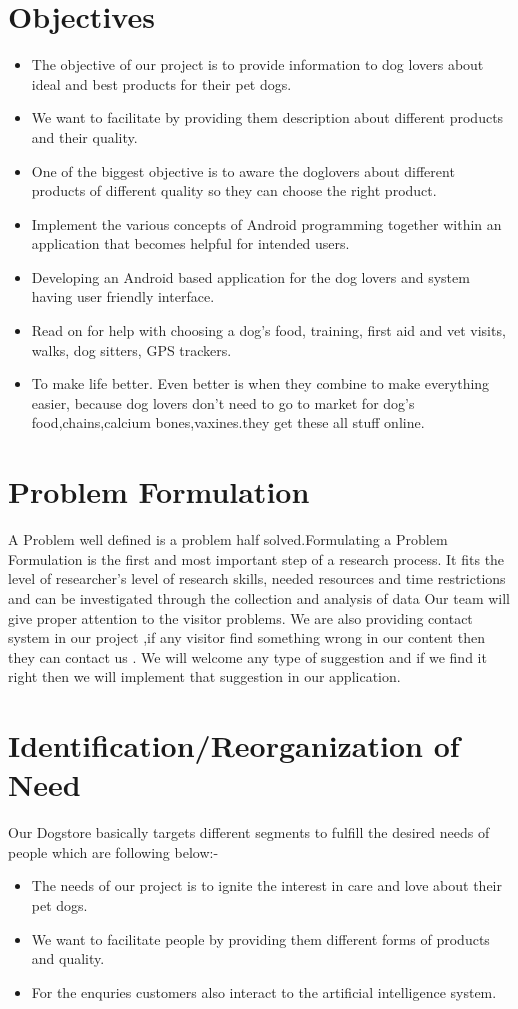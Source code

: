 \section{Objectives}

\begin{itemize}
	\item The objective of our project is to provide information to dog lovers about ideal and best products for their pet dogs.
	\item We want to facilitate by providing them description about different products and their quality. 
	\item One of the biggest objective is to aware the doglovers about different products of different quality so they  can choose the right product.
	\item Implement the various concepts of Android programming together within an application that becomes helpful for intended users.
	\item Developing an Android based application for the dog lovers and system having user friendly interface.
	\item Read on for help with choosing a dog's food, training, first aid and vet visits, walks, dog sitters, GPS trackers.
	\item To make life better. Even better is when they combine to make everything easier, because dog lovers don't need to go to market for dog's food,chains,calcium bones,vaxines.they get these all stuff online.
\end{itemize}
 

\section{Problem Formulation}
A Problem well defined is a problem half solved.Formulating a Problem Formulation is the first and most important step of a research process. It fits the level of researcher’s level of research skills, needed resources and time restrictions and can be investigated through the collection and analysis of data 
Our team will give proper attention to the visitor problems.   
We are also providing contact system in our project  ,if any visitor find something wrong in our content then  they can contact us . 
We will welcome any type of suggestion and if we find it right then we will implement that suggestion in our application.


\section{Identification/Reorganization of Need}
Our Dogstore basically targets different segments to fulfill the desired needs of people which are following below:-
\begin{itemize}
\item The needs of our project is to ignite the interest in care and love about their pet dogs.
\item We want to facilitate people by providing them different forms of products and quality.
\item For the enquries customers also interact to the artificial intelligence system.
\end{itemize}

